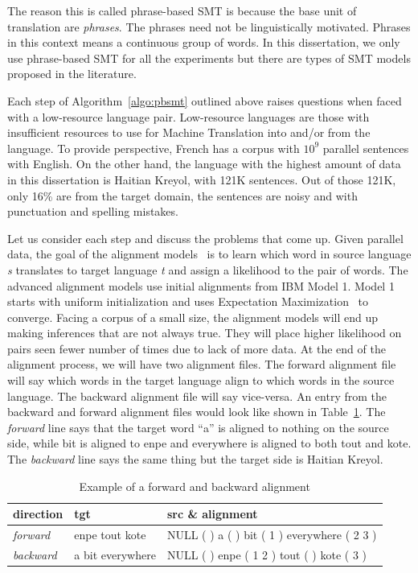 The reason this is called phrase-based SMT is because the base unit of translation are \emph{phrases}. The phrases need not be linguistically motivated. Phrases in this context means a continuous group of words. In this dissertation, we only use phrase-based SMT for all the experiments but there are types of SMT models proposed in the literature.~\cite{Chiang:07,Michel:04}

Each step of Algorithm~\ref{algo:pbsmt} outlined above raises questions when faced with a low-resource language pair. Low-resource languages are those with insufficient resources to use for Machine Translation into and/or from the language. To provide perspective, French has a corpus with $10^9$ parallel sentences with English. On the other hand, the language with the highest amount of data in this dissertation is Haitian Kreyol, with 121K sentences. Out of those 121K, only 16\% are from the target domain, the sentences are noisy and with punctuation and spelling mistakes.


Let us consider each step and discuss the problems that come up. Given parallel data, the goal of the alignment models~\cite{Brown:1993,Vogel:1996} is to learn which word in source language \emph{s} translates to target language \emph{t} and assign a likelihood to the pair of words. The advanced alignment models use initial alignments from IBM Model 1. Model 1 starts with uniform initialization and uses Expectation Maximization~\cite{Dempster:77} to converge. Facing a corpus of a small size, the alignment models will end up making inferences that are not always true. They will place higher likelihood on pairs seen fewer number of times due to lack of more data. At the end of the alignment process, we will have two alignment files. The forward alignment file will say which words in the target language align to which words in the source language. The backward alignment file will say vice-versa. An entry from the backward and forward alignment files would look like shown in Table~\ref{table:example_fwd_backward}. The \emph{forward} line says that the target word ``a'' is aligned to nothing on the source side, while bit is aligned to enpe and everywhere is aligned to both tout and kote. The \emph{backward} line says the same thing but the target side is Haitian Kreyol. 

\begin{table}
\small
\small
\begin{tabular}{lp{}p{}}
\toprule
direction & tgt & src \& alignment \\
\toprule
\emph{forward} & enpe tout kote & NULL ({ }) a ({ }) bit ({ 1 }) everywhere ({ 2 3 })  \\
\emph{backward} & a bit everywhere & NULL ({ }) enpe ({ 1 2 }) tout ({ }) kote ({ 3 }) \\
\bottomrule
\end{tabular}
\caption{Example of a forward and backward alignment}
\label{table:example_fwd_backward}
\end{table}


